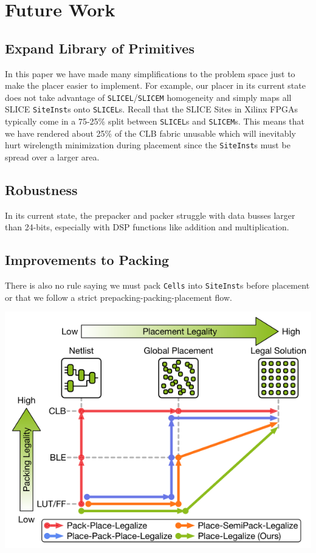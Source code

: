 \section{Future Work}

\subsection{Expand Library of Primitives}
In this paper we have made many simplifications to the problem space just to make the placer easier to implement.
For example, our placer in its current state does not take advantage of \texttt{SLICEL}/\texttt{SLICEM} homogeneity and simply maps all SLICE \texttt{SiteInst}s onto \texttt{SLICEL}s. 
Recall that the SLICE Sites in Xilinx FPGAs typically come in a 75-25\% split between \texttt{SLICEL}s and \texttt{SLICEM}s. 
This means that we have rendered about 25\% of the CLB fabric unusable which will inevitably hurt wirelength minimization during placement since the \texttt{SiteInst}s must be spread over a larger area. 

\subsection{Robustness}
In its current state, the prepacker and packer struggle with data busses larger than 24-bits, especially with DSP functions like addition and multiplication. 

\subsection{Improvements to Packing}
There is also no rule saying we must pack \texttt{Cells} into \texttt{SiteInst}s before placement or that we follow a strict prepacking-packing-placement flow. 

{
    \centering
    \includegraphics[width=\columnwidth]{figures/future_work/legalization.png}
}
\vspace{0.25cm}


